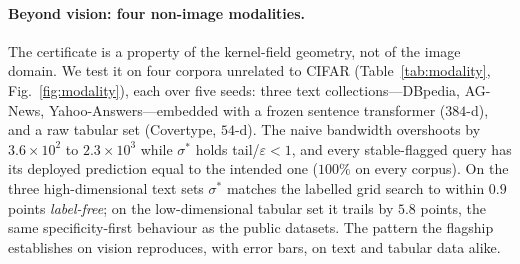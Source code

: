\documentclass[10pt,twocolumn]{article}
\newcommand{\sstar}{\sigma^{*}}
\begin{document}
\paragraph{Beyond vision: four non-image modalities.} The certificate is a property of the kernel-field geometry, not of the image domain. We test it on four corpora unrelated to CIFAR (Table~\ref{tab:modality}, Fig.~\ref{fig:modality}), each over five seeds: three text collections---DBpedia, AG-News, Yahoo-Answers---embedded with a frozen sentence transformer ($384$-d), and a raw tabular set (Covertype, $54$-d). The naive bandwidth overshoots by $3.6\times10^2$ to $2.3\times10^3$ while $\sstar$ holds tail/$\varepsilon<1$, and every stable-flagged query has its deployed prediction equal to the intended one ($100\%$ on every corpus). On the three high-dimensional text sets $\sstar$ matches the labelled grid search to within $0.9$ points \emph{label-free}; on the low-dimensional tabular set it trails by $5.8$ points, the same specificity-first behaviour as the public datasets. The pattern the flagship establishes on vision reproduces, with error bars, on text and tabular data alike.
\end{document}
